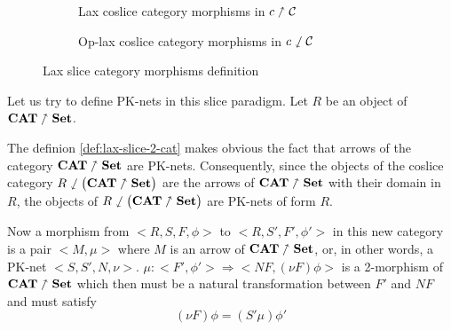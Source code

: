 \begin{figure*}[t!]
\begin{subfigure}[t]{0.47\textwidth}
        \caption{Lax coslice category morphisms in $c\nnearrow\mathcal{C}$}
        \label{fig:lax-coslice-def}
    \end{subfigure}%
    \hfill
    \begin{subfigure}[t]{0.47\textwidth}
        \centering
        \caption{Op-lax coslice category morphisms in
            $c \sswarrow \mathcal{C}$}
        \label{fig:oplax-coslice-def}
    \end{subfigure}
    \caption{Lax slice category morphisms definition}
    \label{fig:all-lax-slice-def}
\end{figure*}

Let us try to define PK-nets in this slice paradigm. Let $R$ be an object of $\textbf{CAT}\nnearrow\bf Set$.

The definion \ref{def:lax-slice-2-cat} makes obvious the fact that arrows of the category $\textbf{CAT}\nnearrow\bf Set$ are PK-nets. Consequently, since the objects of the coslice category $R\sswarrow\big(\textbf{CAT}\nnearrow\bf Set\big)$ are the arrows of $\textbf{CAT}\nnearrow\bf Set$ with their domain in $R$, the objects of  $R\sswarrow\big(\textbf{CAT}\nnearrow\bf Set\big)$ are PK-nets of form $R$.

Now a morphism from $\big<R,S,F,\phi\big>$ to  $\big<R,S',F',\phi'\big>$ in this new category is a pair $\big<M,\mu\big>$ where $M$ is an arrow  of $\textbf{CAT}\nnearrow\bf Set$, or, in other words, a PK-net $\big<S,S',N,\nu\big>$. $\mu : \big<F',\phi'\big>\Rightarrow \big<NF,(\nu F)\phi\big>$ is a 2-morphism of  $\textbf{CAT}\nnearrow\bf Set$ which then must be a natural transformation between $F'$ and $NF$ and must satisfy
\begin{equation*}
    (\nu F)\phi = (S'\mu)\phi'
\end{equation*}

